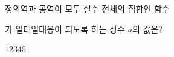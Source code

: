 \hspace*{2mm}\begin{minipage}[t]{\dimexpr\linewidth-2mm\relax}\vspace{0pt}
정의역과 공역이 모두 실수 전체의 집합인 함수\par\smallskip{}\par\smallskip\noindent 가 일대일대응이 되도록 하는 상수 $a$의 값은?
\begin{choices32}{$1$}{$2$}{$3$}{$4$}{$5$}\end{choices32}\end{minipage}
